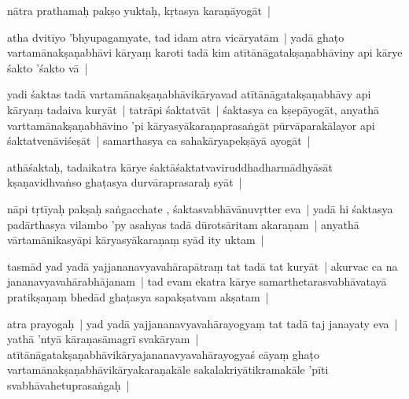 \documentclass[article,12pt,a4paper]{memoir}%
\newcounter{parCount}
\begin{document}
	  \pstart \leavevmode%
	\label{thakur75-68.3}nātra prathamaḥ pakṣo yuktaḥ, kṛtasya karaṇāyogāt |
	{}
	\pend%
      

	  \pstart \leavevmode%
	\label{thakur75-68.4}atha dvitīyo 'bhyupagamyate, tad idam atra vicāryatām | yadā ghaṭo vartamānakṣaṇabhāvi kāryaṃ karoti tadā kim atītānāgatakṣaṇabhāviny api kārye śakto 'śakto vā |
	{}
	\pend%
      

	  \pstart \leavevmode%
	\label{thakur75-68.6}yadi śaktas tadā vartamānakṣaṇabhāvikāryavad atītānāgatakṣaṇabhāvy api kāryaṃ tadaiva kuryāt | tatrāpi śaktatvāt | śaktasya ca kṣepāyogāt, anyathā varttamānakṣaṇabhāvino 'pi kāryasyākaraṇaprasaṅgāt pūrvāparakālayor api śaktatvenāviśeṣāt | samarthasya ca sahakāryapekṣāyā ayogāt | 
	{}
	\pend%
      

	  \pstart \leavevmode%
	\label{thakur75-68.9}athāśaktaḥ, tadaikatra kārye śaktāśaktatvaviruddhadharmādhyāsāt kṣaṇavidhvaṅso ghaṭasya durvāraprasaraḥ syāt |
	{}
	\pend%
      

	  \pstart \leavevmode%
	\label{thakur75-68.11}nāpi tṛtīyaḥ pakṣaḥ saṅgacchate , śaktasvabhāvānuvṛtter eva | yadā hi śaktasya padārthasya vilambo 'py asahyas tadā dūrotsāritam akaraṇam | anyathā vārtamānikasyāpi kāryasyākaraṇaṃ syād ity uktam | 
	{}
	\pend%
      

	  \pstart \leavevmode%
	\label{thakur75-68.14}tasmād yad yadā yajjananavyavahārapātraṃ tat tadā tat kuryāt | akurvac ca na jananavyavahārabhājanam | tad evam ekatra kārye samarthetarasvabhāvatayā pratikṣaṇaṃ bhedād ghaṭasya sapakṣatvam akṣatam |
	{}
	\pend%
      

	  \pstart \leavevmode%
	\label{thakur75-68.17}atra prayogaḥ | yad yadā yajjananavyavahārayogyaṃ tat tadā taj janayaty eva | yathā 'ntyā kāraṇasāmagrī svakāryam | atītānāgatakṣaṇabhāvikāryajananavyavahārayogyaś cāyaṃ ghaṭo vartamānakṣaṇabhāvikāryakaraṇakāle sakalakriyātikramakāle 'pīti svabhāvahetuprasaṅgaḥ |
	{}
	\pend%
      
\end{document}
